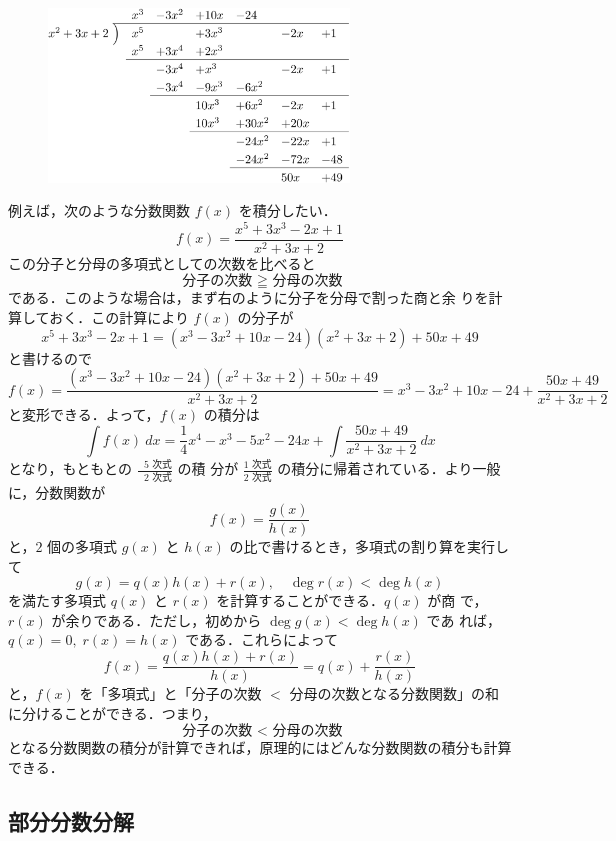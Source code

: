 \documentclass[10pt, uplatex, dvipdfmx]{jsarticle}
\theoremstyle{definition}
\numberwithin{equation}{section}
\newcommand{\ds}{\displaystyle}
\begin{document}
\begin{figure}
  \centering
  \includegraphics[width=8cm]{./pictures/03/remainder.pdf}
\end{figure}
例えば，次のような分数関数 $f(x)$ を積分したい．
\[
  f(x) = \frac{x^5+3x^3-2x+1}{x^2+3x+2}
\]
この分子と分母の多項式としての次数を比べると
\[
  \text{ 分子の次数 }  \geqq \text{ 分母の次数} 
\]
である．このような場合は，まず右のように分子を分母で割った商と余
りを計算しておく．この計算により $f(x)$ の分子が
\[
  x^5+3x^3-2x+1 = (x^3-3x^2+10x-24)(x^2+3x+2) + 50x+49
\]
と書けるので
\[
  f(x) = \frac{ (x^3-3x^2+10x-24)(x^2+3x+2) + 50x+49}{x^2+3x+2} = x^3-3x^2+10x-24 + \frac{50x+49}{x^2+3x+2}
\]
と変形できる．よって，$f(x)$ の積分は
\[
  \int f(x) \ dx = \frac{1}{4}x^4 - x^3-5x^2-24x + \int
  \frac{50x+49}{x^2+3x+2} \ dx
\]
となり，もともとの $\ds \frac{\text{ $5$ 次式}}{\text{ $2$ 次式}}$ の積
分が $\ds \frac{\text{$1$ 次式}}{\text{$2$ 次式}}$ の積分に帰着されている．より一般に，分数関数が
\[
  f(x) = \frac{g(x)}{h(x)}
\]
と，$2$ 個の多項式 $g(x)$ と $h(x)$ の比で書けるとき，多項式の割り算を実行して
\[
  g(x) = q(x) h(x) + r(x), \quad \deg r(x) < \deg h(x)
\]
を満たす多項式 $q(x)$ と $r(x)$ を計算することができる．$q(x)$ が商
で，$r(x)$ が余りである．ただし，初めから $\deg g(x) < \deg h(x)$ であ
れば，$q(x)=0, \; r(x) = h(x)$ である．これらによって
\[
  f(x) = \frac{q(x)h(x)+r(x)}{h(x)} = q(x) + \frac{r(x)}{h(x)}
\]
と，$f(x)$ を「多項式」と「分子の次数 $<$ 分母の次数となる分数関数」の和に分けることができる．つまり，
\[
  \text{ 分子の次数 } < \text{ 分母の次数}
\]
となる分数関数の積分が計算できれば，原理的にはどんな分数関数の積分も計算できる．

\subsection{部分分数分解}\label{subsec:partfrac}
\end{document}
